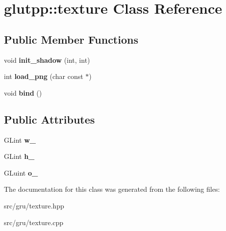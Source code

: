 \hypertarget{classglutpp_1_1texture}{\section{glutpp\-:\-:texture \-Class \-Reference}
\label{classglutpp_1_1texture}
}
\subsection*{\-Public \-Member \-Functions}
\begin{DoxyCompactItemize}
\item 
\hypertarget{classglutpp_1_1texture_a54de9aed503f8a506c4f075704e57342}{void {\bfseries init\-\_\-shadow} (int, int)}\label{classglutpp_1_1texture_a54de9aed503f8a506c4f075704e57342}

\item 
\hypertarget{classglutpp_1_1texture_aa41352eec52619c4f28829984f425e35}{int {\bfseries load\-\_\-png} (char const $\ast$)}\label{classglutpp_1_1texture_aa41352eec52619c4f28829984f425e35}

\item 
\hypertarget{classglutpp_1_1texture_a3854975201918ef4a98a87410c8721f3}{void {\bfseries bind} ()}\label{classglutpp_1_1texture_a3854975201918ef4a98a87410c8721f3}

\end{DoxyCompactItemize}
\subsection*{\-Public \-Attributes}
\begin{DoxyCompactItemize}
\item 
\hypertarget{classglutpp_1_1texture_a351a5f3dca555da7f15db2ea1a5c079b}{\-G\-Lint {\bfseries w\-\_\-}}\label{classglutpp_1_1texture_a351a5f3dca555da7f15db2ea1a5c079b}

\item 
\hypertarget{classglutpp_1_1texture_ab3bfa2904ae0ada7ae88d4493e1fc2fe}{\-G\-Lint {\bfseries h\-\_\-}}\label{classglutpp_1_1texture_ab3bfa2904ae0ada7ae88d4493e1fc2fe}

\item 
\hypertarget{classglutpp_1_1texture_a501fc15c4497264dcb92e5ee21b94837}{\-G\-Luint {\bfseries o\-\_\-}}\label{classglutpp_1_1texture_a501fc15c4497264dcb92e5ee21b94837}

\end{DoxyCompactItemize}


\-The documentation for this class was generated from the following files\-:\begin{DoxyCompactItemize}
\item 
src/gru/texture.\-hpp\item 
src/gru/texture.\-cpp\end{DoxyCompactItemize}
